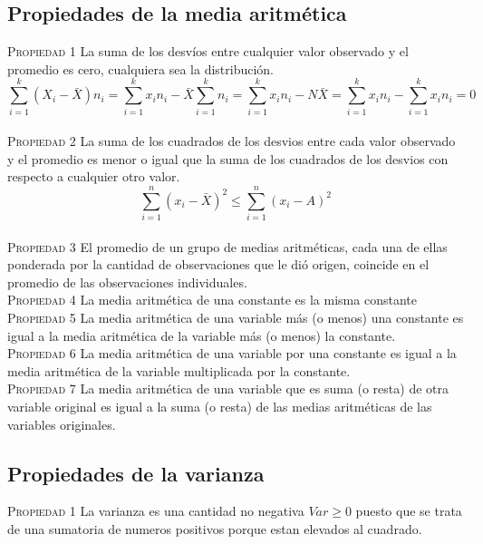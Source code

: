 \documentclass[10pt,a4paper]{article}
\begin{document}
\subsection{Propiedades de la media aritmética}
\textsc{Propiedad 1} La suma de los desvíos entre cualquier valor observado y el promedio es cero, cualquiera sea la distribución.
\begin{equation}
	\sum_{i=1}^{k}(X_i-\bar{X})n_i=\sum_{i=1}^{k}x_i n_i-\bar{X}\sum_{i=1}^{k}n_i=\sum_{i=1}^{k}x_i n_i-N\bar{X}=\sum_{i=1}^{k}x_i n_i-\sum_{i=1}^{k}x_i n_i=0
\end{equation}
\\
\textsc{Propiedad 2} La suma de los cuadrados de los desvios entre cada valor observado y el promedio es menor o igual que la suma de los cuadrados de los desvios con respecto a cualquier otro valor.
\begin{equation}
	\sum_{i=1}^{n}(x_i-\bar{X})^2\leq \sum_{i=1}^{n}(x_i-A)^2
\end{equation}\\
\textsc{Propiedad 3} El promedio de un grupo de medias aritméticas, cada una de ellas ponderada por la cantidad de observaciones que le dió origen, coincide en el promedio de las observaciones individuales.\\

\textsc{Propiedad 4} La media aritmética de una constante es la misma constante\\

\textsc{Propiedad 5} La media aritmética de una variable más (o menos) una constante es igual a la media aritmética de la variable más (o menos) la constante.\\

\textsc{Propiedad 6} La media aritmética de una variable por una constante es igual a la media aritmética de la variable multiplicada por la constante.\\

\textsc{Propiedad 7} La media aritmética de una variable que es suma (o resta) de otra variable original es igual a la suma (o resta) de las medias aritméticas de las variables originales.\\
\subsection{Propiedades de la varianza}
\textsc{Propiedad 1} La varianza es una cantidad no negativa $Var\geq 0$ puesto que se trata de una sumatoria de numeros positivos porque estan elevados al cuadrado.\\
\end{document}
